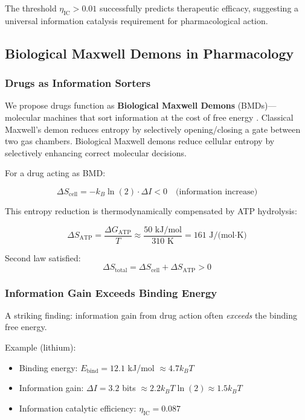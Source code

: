 \documentclass{article}
\begin{document}
The threshold $\eta_{\text{IC}} > 0.01$ successfully predicts therapeutic efficacy, suggesting a universal information catalysis requirement for pharmacological action.

\subsection{Biological Maxwell Demons in Pharmacology}

\subsubsection{Drugs as Information Sorters}

We propose drugs function as \textbf{Biological Maxwell Demons} (BMDs)—molecular machines that sort information at the cost of free energy \citep{Sagawa2010,Parrondo2015}. Classical Maxwell's demon reduces entropy by selectively opening/closing a gate between two gas chambers. Biological Maxwell demons reduce cellular entropy by selectively enhancing correct molecular decisions.

For a drug acting as BMD:

\begin{equation}
\Delta S_{\text{cell}} = -k_B \ln(2) \cdot \Delta I < 0 \quad \text{(information increase)}
\end{equation}

This entropy reduction is thermodynamically compensated by ATP hydrolysis:

\begin{equation}
\Delta S_{\text{ATP}} = \frac{\Delta G_{\text{ATP}}}{T} \approx \frac{50 \text{ kJ/mol}}{310 \text{ K}} = 161 \text{ J/(mol·K)}
\end{equation}

Second law satisfied:
\begin{equation}
\Delta S_{\text{total}} = \Delta S_{\text{cell}} + \Delta S_{\text{ATP}} > 0
\end{equation}

\subsubsection{Information Gain Exceeds Binding Energy}

A striking finding: information gain from drug action often \textit{exceeds} the binding free energy.

Example (lithium):
\begin{itemize}
    \item Binding energy: $E_{\text{bind}} = 12.1$ kJ/mol $ \approx 4.7 k_B T$
    \item Information gain: $\Delta I = 3.2$ bits $ \approx 2.2 k_B T \ln(2) \approx 1.5 k_B T$
    \item Information catalytic efficiency: $\eta_{\text{IC}} = 0.087$
\end{itemize}
\end{document}
